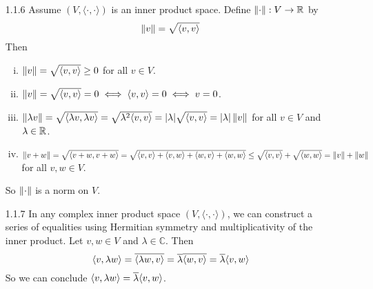\documentclass[../../Solutions.tex]{subfiles}
\begin{document}
\begin{itemize}
	\item [1.1.6] Assume $(V,\langle\cdot,\cdot\rangle)$ is an inner product space.
	Define $\left\lVert\cdot\right\rVert:V \to \mathbb{R}$ by
	$$ \left\lVert v\right\rVert = \sqrt{\langle v,v \rangle} $$
	Then
	\begin{enumerate}[(i)]
		\item $\left\lVert v\right\rVert = \sqrt{\langle v,v \rangle} \geq 0$ for all $v \in V$.
		\item $\left\lVert v\right\rVert = \sqrt{\langle v,v \rangle} = 0 \iff \langle v,v \rangle = 0 \iff v = 0$.
		\item $\left\lVert\lambda v\right\rVert = \sqrt{\langle \lambda v,\lambda v \rangle} = \sqrt{\lambda^2\langle v,v \rangle} = |\lambda|\sqrt{\langle v,v \rangle} = |\lambda|\left\lVert v\right\rVert$ for all $v \in V$ and $\lambda \in \mathbb{R}$.
		\item $\left\lVert v+w\right\rVert = \sqrt{\langle v+w,v+w \rangle} = \sqrt{\langle v,v \rangle + \langle v,w \rangle + \langle w,v \rangle + \langle w,w \rangle} \leq \sqrt{\langle v,v \rangle} + \sqrt{\langle w,w \rangle} = \left\lVert v\right\rVert+\left\lVert w\right\rVert$ for all $v,w \in V$.
	\end{enumerate}
	So $\left\lVert\cdot\right\rVert$ is a norm on $V$.
	
	\item [1.1.7] In any complex inner product space $(V,\langle\cdot,\cdot\rangle)$, we can construct a series of equalities using Hermitian symmetry and multiplicativity of the inner product.
	Let $v,w \in V$ and $\lambda \in \mathbb{C}$. Then
	$$ \langle v,\lambda w \rangle = \overline{\langle \lambda w,v \rangle} = \overline{\lambda} \overline{\langle w,v \rangle} = \overline{\lambda}\langle v,w \rangle $$
	So we can conclude $\langle v,\lambda w \rangle = \overline{\lambda}\langle v,w \rangle$.
	

\end{itemize}
\end{document}
